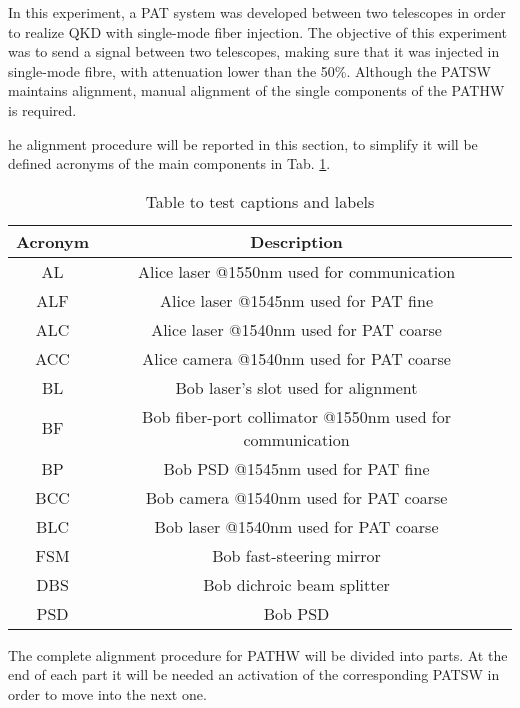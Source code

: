 In this experiment, a PAT system was developed between two telescopes in order to realize QKD with single-mode fiber injection.
The objective of this experiment was to send a signal between two telescopes, making sure that it was injected in single-mode fibre, with attenuation lower than the 50\%.
Although the PATSW maintains alignment, manual alignment of the single components of the PATHW is required.

he alignment procedure will be reported in this section, to simplify it will be defined acronyms of the main components in Tab. \ref{table:1}.

\begin{table}[h!]
  \centering
  \begin{tabular}{ |c|c|c| }
    \hline
    Acronym & Description                                              \\
    \hline
    AL      & Alice laser @1550nm used for communication               \\
    ALF     & Alice laser @1545nm used for PAT fine                    \\
    ALC     & Alice laser @1540nm used for PAT coarse                  \\
    ACC     & Alice camera @1540nm used for PAT coarse                 \\
    \hline
    BL      & Bob laser's slot used for alignment                      \\
    BF      & Bob fiber-port collimator @1550nm used for communication \\
    BP      & Bob PSD @1545nm used for PAT fine                        \\
    BCC     & Bob camera @1540nm used for PAT coarse                   \\
    BLC     & Bob laser @1540nm used for PAT coarse                    \\
    FSM     & Bob fast-steering mirror                                 \\
    DBS     & Bob dichroic beam splitter                               \\
    PSD     & Bob PSD                                                  \\
    \hline
  \end{tabular}
  \caption{Table to test captions and labels}
  \label{table:1}
\end{table}
The complete alignment procedure for PATHW will be divided into parts. At the end of each part it will be needed an activation of the corresponding PATSW in order to move into the next one.

